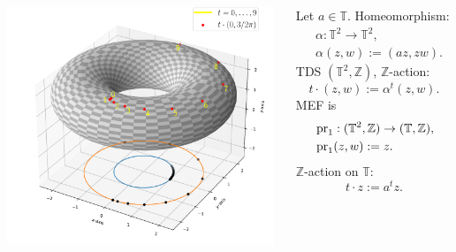 \begin{frame}
  
\end{frame}
\begin{frame}
  \begin{columns}
    \begin{column}{0.6\textwidth}
    \centering
      \includegraphics[width=8cm]{imgs/torusSkewRot.pdf}
    \end{column}
    \begin{column}{0.4\textwidth}
  \begin{example}
Let $a \in \mathbb{T}$. Homeomorphism:
\begin{equation*}
  \begin{split}
    &\alpha: \mathbb{T}^2 \to \mathbb{T}^2,\\
  &\alpha (z,w) := (az,zw).
  \end{split}
  \end{equation*}
     TDS $(\mathbb{T}^2,\mathbb{Z})$, $\mathbb{Z}$-action:
     \begin{equation*}
     t \cdot (z,w) := \alpha^t (z,w).
     \end{equation*}
     \pause
  MEF is 
  \begin{equation*}
    \begin{split}
     &\operatorname{pr}_1 : (\mathbb{T}^2,\mathbb{Z}) \to (\mathbb{T},\mathbb{Z}), \\
    &\operatorname{pr}_1 (z,w) := z.
    \end{split}
  \end{equation*}
  $\mathbb{Z}$-action on $\mathbb{T}$:
  \begin{equation*}
   t\cdot  z := a^tz.
  \end{equation*}
\end{example}
       \end{column}
  \end{columns}
\end{frame}
